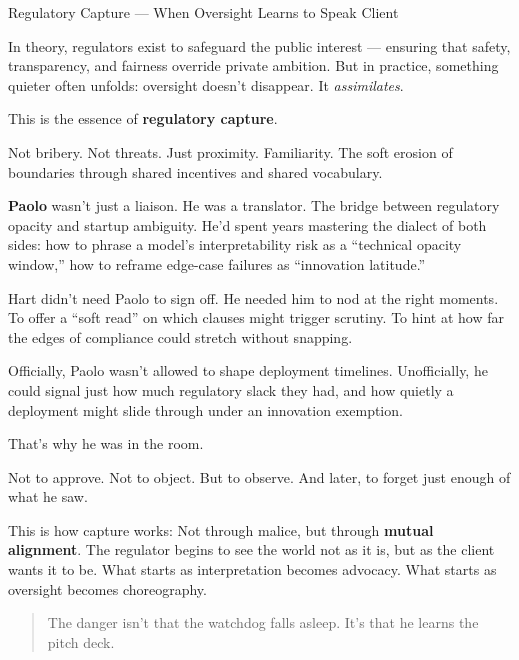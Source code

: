 \begin{PhilosophicalSidebar}{Regulatory Capture — When Oversight Learns to Speak Client}

  In theory, regulators exist to safeguard the public interest — ensuring that safety, transparency, and fairness 
  override private ambition.  
  But in practice, something quieter often unfolds: oversight doesn’t disappear. It \textit{assimilates}.  

  \medskip
  
  This is the essence of \textbf{regulatory capture}.

  \medskip
  
  Not bribery. Not threats.  
  Just proximity. Familiarity. The soft erosion of boundaries through shared incentives and shared vocabulary.
  
  \medskip
  
  \textbf{Paolo} wasn’t just a liaison. He was a translator.  
  The bridge between regulatory opacity and startup ambiguity.  
  He’d spent years mastering the dialect of both sides: how to phrase a model’s interpretability risk as a “technical 
  opacity window,” how to reframe edge-case failures as “innovation latitude.”
  
  \medskip
  
  Hart didn’t need Paolo to sign off.  
  He needed him to nod at the right moments.  
  To offer a “soft read” on which clauses might trigger scrutiny.  
  To hint at how far the edges of compliance could stretch without snapping.
  
  \medskip
  
  Officially, Paolo wasn’t allowed to shape deployment timelines.  
  Unofficially, he could signal just how much regulatory slack they had, and how quietly a deployment might slide 
  through under an innovation exemption.

  \medskip
  
  That’s why he was in the room.

  \medskip
  
  Not to approve.  
  Not to object.  
  But to observe. And later, to forget just enough of what he saw.
  
  \medskip
  
  This is how capture works:  
  Not through malice, but through \textbf{mutual alignment}.  
  The regulator begins to see the world not as it is, but as the client wants it to be.  
  What starts as interpretation becomes advocacy.  
  What starts as oversight becomes choreography.
  
  \begin{quote}
  The danger isn’t that the watchdog falls asleep.  
  It’s that he learns the pitch deck.
  \end{quote}
  
\end{PhilosophicalSidebar}

